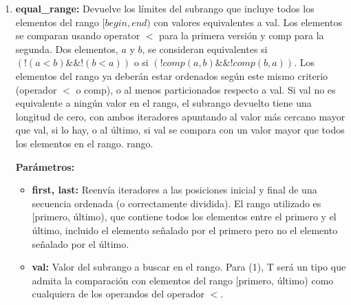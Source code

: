 \begin{enumerate}
\begin{lstlisting}[language=C++]
#include <iostream>  // std::cout
#include <algorithm> // std::lower_bound, std::upper_bound, std::sort
#include <vector>    // std::vector
	
int main () {
   int myints[] = {10,20,30,30,20,10,10,20};
   std::vector<int> v(myints,myints+8);           // 10 20 30 30 20 10 10 20
		
   std::sort (v.begin(), v.end());                // 10 10 10 20 20 20 30 30
		
   std::vector<int>::iterator low,up;
   low=std::lower_bound (v.begin(), v.end(), 20); //          ^
   up= std::upper_bound (v.begin(), v.end(), 20); //                   ^
		
   std::cout << "limite inferior en la posicion " << (low- v.begin()) << '\n';
   std::cout << "limite superior en la posicion " << (up - v.begin()) << '\n';
		
   return 0;
}
\end{lstlisting}

\item \textbf{equal\_range:} Devuelve los límites del subrango que incluye todos los elementos del rango $[begin, end)$ con valores equivalentes a val. Los elementos se comparan usando operator $<$ para la primera versión y comp para la segunda. Dos elementos, $a$ y $b$, se consideran equivalentes si $(!(a<b) \&\& !(b<a))$ o si $(!comp(a,b) \&\& !comp(b,a))$. Los elementos del rango ya deberán estar ordenados según este mismo criterio (operador $<$ o comp), o al menos particionados respecto a val. Si val no es equivalente a ningún valor en el rango, el subrango devuelto tiene una longitud de cero, con ambos iteradores apuntando al valor más cercano mayor que val, si lo hay, o al último, si val se compara con un valor mayor que todos los elementos en el rango. rango.


\textbf{Parámetros:}

\begin{itemize}
	\item \textbf{first, last:} Reenvía iteradores a las posiciones inicial y final de una secuencia ordenada (o correctamente dividida). El rango utilizado es [primero, último), que contiene todos los elementos entre el primero y el último, incluido el elemento señalado por el primero pero no el elemento señalado por el último.
	
	
	\item \textbf{val:} Valor del subrango a buscar en el rango.
	Para (1), T será un tipo que admita la comparación con elementos del rango [primero, último) como cualquiera de los operandos del operador $<$.
	

\end{itemize}
\end{enumerate}

